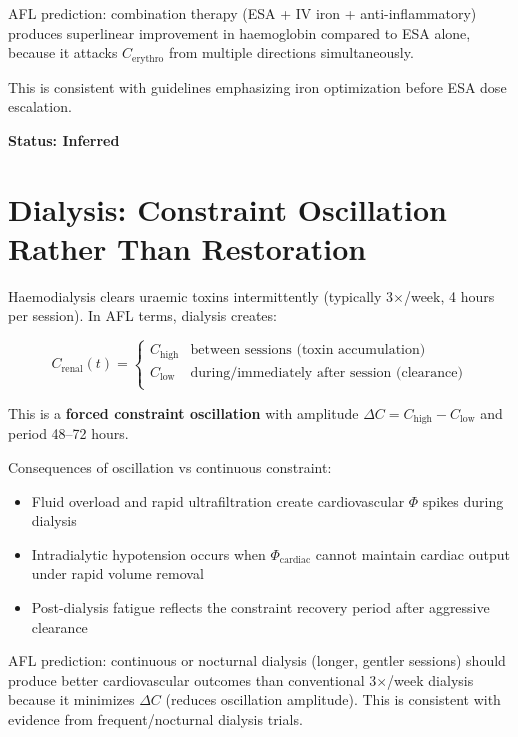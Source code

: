 \documentclass[12pt,a4paper]{article}
\begin{document}
AFL prediction: combination therapy (ESA + IV iron + anti-inflammatory) produces superlinear improvement in haemoglobin compared to ESA alone, because it attacks $C_{\mathrm{erythro}}$ from multiple directions simultaneously.

This is consistent with guidelines emphasizing iron optimization before ESA dose escalation.

\textbf{Status: Inferred}

\section{Dialysis: Constraint Oscillation Rather Than Restoration}

Haemodialysis clears uraemic toxins intermittently (typically 3$\times$/week, 4 hours per session). In AFL terms, dialysis creates:

\begin{equation}
    C_{\mathrm{renal}}(t) = \begin{cases}
        C_{\mathrm{high}} & \text{between sessions (toxin accumulation)} \\
        C_{\mathrm{low}} & \text{during/immediately after session (clearance)} \\
    \end{cases}
\end{equation}

This is a \textbf{forced constraint oscillation} with amplitude $\Delta C = C_{\mathrm{high}} - C_{\mathrm{low}}$ and period 48--72 hours.

Consequences of oscillation vs continuous constraint:
\begin{itemize}
    \item Fluid overload and rapid ultrafiltration create cardiovascular $\Phi$ spikes during dialysis
    \item Intradialytic hypotension occurs when $\Phi_{\mathrm{cardiac}}$ cannot maintain cardiac output under rapid volume removal
    \item Post-dialysis fatigue reflects the constraint recovery period after aggressive clearance
\end{itemize}

AFL prediction: continuous or nocturnal dialysis (longer, gentler sessions) should produce better cardiovascular outcomes than conventional 3$\times$/week dialysis because it minimizes $\Delta C$ (reduces oscillation amplitude). This is consistent with evidence from frequent/nocturnal dialysis trials.
\end{document}
